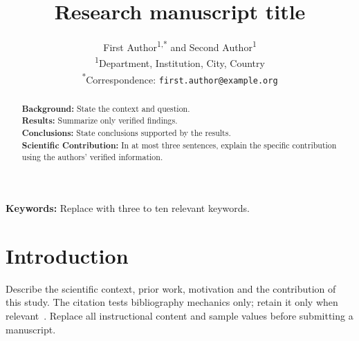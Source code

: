 \documentclass[11pt]{article}
\title{Research manuscript title}
\author{First Author\textsuperscript{1,*} and Second Author\textsuperscript{1}\\
  \small \textsuperscript{1}Department, Institution, City, Country\\
  \small \textsuperscript{*}Correspondence: \texttt{first.author@example.org}}
\date{}
\begin{document}
\linenumbers
\maketitle
\begin{abstract}
\noindent\textbf{Background:} State the context and question.\\
\textbf{Results:} Summarize only verified findings.\\
\textbf{Conclusions:} State conclusions supported by the results.\\
\textbf{Scientific Contribution:} In at most three sentences, explain the
specific contribution using the authors' verified information.
\end{abstract}
\noindent\textbf{Keywords:} Replace with three to ten relevant keywords.

\section{Introduction}\label{sec:introduction}
Describe the scientific context, prior work, motivation and the contribution of
this study. The citation tests bibliography mechanics only; retain it only when
relevant~\cite{wilkinson2016fair}. Replace all instructional content and sample
values before submitting a manuscript.
\end{document}
